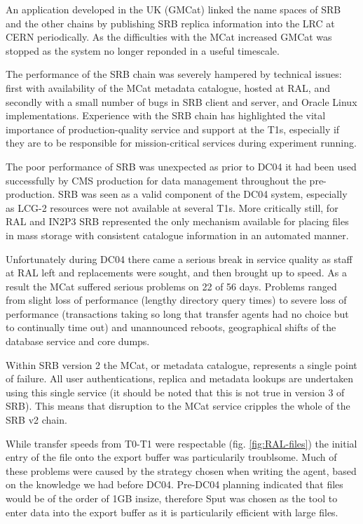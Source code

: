 \documentclass{cmspaper}
\begin{document}
An application developed in the UK (GMCat) linked the name spaces of
SRB and the other chains by publishing SRB replica information into
the LRC at CERN periodically. As the difficulties with the MCat
increased GMCat was stopped as the system no longer reponded in a
useful timescale.

The performance of the SRB chain was severely hampered by technical
issues: first with availability of the MCat metadata catalogue, hosted
at RAL, and secondly with a small number of bugs in SRB client and
server, and Oracle Linux implementations. Experience with the SRB
chain has highlighted the vital importance of production-quality
service and support at the T1s, especially if they are to be
responsible for mission-critical services during experiment running.

The poor performance of SRB was unexpected as prior to DC04 it had been used 
successfully by CMS production for data management throughout the pre-production.
SRB was seen as a valid component of the DC04 system, especially as 
LCG-2 resources were not available at several T1s. 
More critically still, for RAL and IN2P3 SRB represented
the only mechanism available for placing files in mass storage with
consistent catalogue information in an automated manner.

Unfortunately during DC04 there came a serious break in service
quality as staff at RAL left and replacements were sought, and then
brought up to speed.  As a result the MCat suffered serious problems
on 22 of 56 days. Problems ranged from slight loss of performance
(lengthy directory query times) to severe loss of performance
(transactions taking so long that transfer agents had no choice but to
continually time out) and unannounced reboots, geographical shifts of
the database service and core dumps.

Within SRB version 2 the MCat, or metadata catalogue, represents a
single point of failure. All user authentications, replica and
metadata lookups are undertaken using this single service (it should
be noted that this is not true in version 3 of SRB). This means that 
disruption to the MCat service cripples the whole of the SRB v2 chain.

While transfer speeds from T0-T1 were respectable (fig. \ref{fig:RAL-files})
 the initial entry of the file onto the export buffer was
particularily troublsome.  Much of these problems were caused by the
strategy chosen when writing the agent, based on the knowledge we had
before DC04. Pre-DC04 planning indicated that files would be of the order of 1GB insize,
therefore Sput was chosen as the tool to enter data into the export buffer
as it is particularily efficient with large files.
\end{document}
